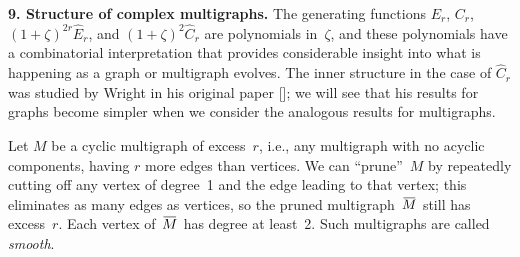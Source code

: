 \bigbreak\noindent
{\bf 9. Structure of complex multigraphs.}\enspace
The generating functions $E_r$, $C_r$, $(1+\zeta)^{2r}\widehat E_r$, and
$(1+\zeta)^2\widehat C_r$ are polynomials in~$\zeta$, and these polynomials
have a combinatorial interpretation that provides considerable insight into
what is happening as a graph or
multigraph evolves. The inner structure in the case of $\widehat C_r$
was studied by Wright in his original paper [\Wi]; we will see that his
results for graphs become
simpler when we consider the analogous results for multigraphs.

Let $M$ be a cyclic multigraph of excess~$r$, i.e., any multigraph with
no acyclic components, having $r$ more edges than vertices. We
can ``prune''~$M$ by repeatedly cutting off any vertex of
degree~1 and the edge leading to that vertex;
this eliminates as many edges as vertices, so the pruned
multigraph~$\ovline{M}$ still has excess~$r$. Each vertex of~$\ovline{M}$
has degree at least~2. Such multigraphs are called {\it smooth}.

